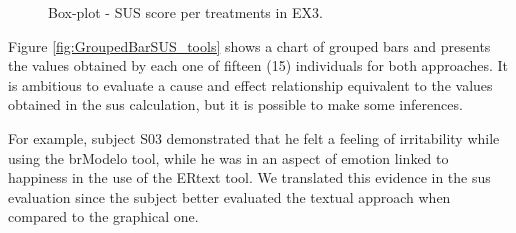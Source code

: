 \begin{figure}[!htb]
    \centering
    \caption{Box-plot - SUS score per treatments in EX3.}
    \label{fig:BoxPlotSUS_tools}
    
\end{figure}

Figure \ref{fig:GroupedBarSUS_tools} shows a chart of grouped bars and presents the values obtained by each one of fifteen (15) individuals for both approaches.
It is ambitious to evaluate a cause and effect relationship equivalent to the values obtained in the \ac{sus} calculation, but it is possible to make some inferences.

For example, subject S03 demonstrated that he felt a feeling of irritability while using the brModelo tool, while he was in an aspect of emotion linked to happiness in the use of the ERtext tool. 
We translated this evidence in the \ac{sus} evaluation since the subject better evaluated the textual approach when compared to the graphical one.

